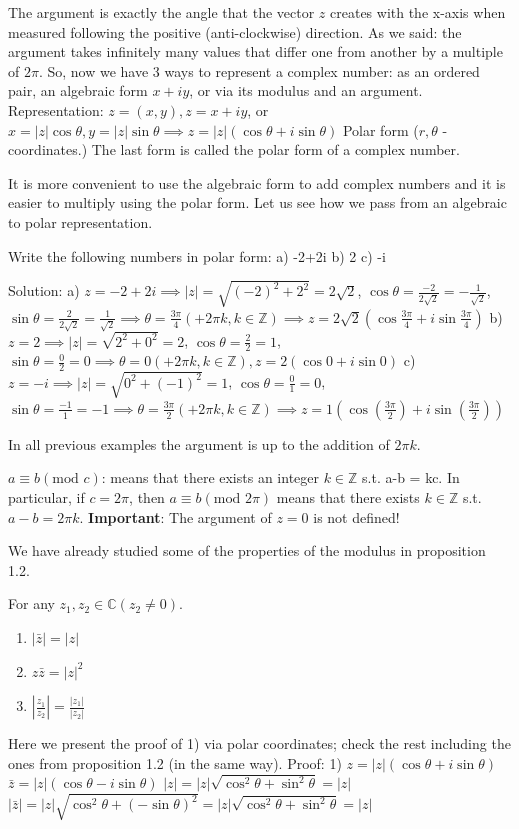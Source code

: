 \documentclass[12pt]{article}
\begin{document}
 The argument is exactly the angle that the vector $z$ creates with the x-axis when measured following the positive (anti-clockwise) direction.
 As we said: the argument takes infinitely many values that differ one from another by a multiple of $2\pi$.
 So, now we have 3 ways to represent a complex number: as an ordered pair, an algebraic form $x+iy$, or via its modulus and an argument.
 Representation: $z=(x,y), z=x+iy$, or $x=|z|\cos\theta, y=|z|\sin\theta \implies z=|z|(\cos\theta + i\sin\theta)$ Polar form ($r,\theta$ - coordinates.)
 The last form is called the polar form of a complex number.

It is more convenient to use the algebraic form to add complex numbers and it is easier to multiply using the polar form. Let us see how we pass from an algebraic to polar representation.

\begin{example}
 Write the following numbers in polar form:
 a) -2+2i b) 2 c) -i

Solution:
a) $z=-2+2i \implies |z| = \sqrt{(-2)^2+2^2} = 2\sqrt{2}$, $\cos\theta = \frac{-2}{2\sqrt{2}} = -\frac{1}{\sqrt{2}}$, $\sin\theta = \frac{2}{2\sqrt{2}} = \frac{1}{\sqrt{2}} \implies \theta = \frac{3\pi}{4}(+2\pi k, k\in \mathbb{Z}) \implies z = 2\sqrt{2}(\cos\frac{3\pi}{4}+i\sin\frac{3\pi}{4})$
b) $z=2 \implies |z| = \sqrt{2^2+0^2} = 2$, $\cos \theta = \frac{2}{2} = 1$, $\sin\theta = \frac{0}{2} = 0 \implies \theta = 0(+2\pi k, k\in \mathbb{Z}), z=2(\cos 0 + i\sin 0)$
c) $z=-i \implies |z| = \sqrt{0^2+(-1)^2} = 1$, $\cos\theta = \frac{0}{1} = 0$, $\sin\theta = \frac{-1}{1}=-1 \implies \theta = \frac{3\pi}{2}(+2\pi k, k\in \mathbb{Z}) \implies z = 1(\cos(\frac{3\pi}{2})+i\sin(\frac{3\pi}{2}))$
\end{example}
 In all previous examples the argument is up to the addition of $2\pi k$.
 \begin{remark}
$a \equiv b(\text{mod } c)$: means that there exists an integer $k\in\mathbb{Z}$ s.t. a-b = kc.
In particular, if $c=2\pi$, then $a\equiv b(\text{mod } 2\pi)$ means that there exists $k \in \mathbb{Z}$ s.t. $a-b = 2\pi k$.
\textbf{Important}: The argument of $z=0$ is not defined!
 \end{remark}
We have already studied some of the properties of the modulus in proposition 1.2.

\begin{proposition}
For any $z_1, z_2 \in \mathbb{C} (z_2\neq 0)$.
\begin{enumerate}
    \item $|\bar{z}|=|z|$
    \item $z\bar{z}=|z|^2$
    \item $\left|\frac{z_1}{z_2}\right| = \frac{|z_1|}{|z_2|}$
\end{enumerate}
\end{proposition}
Here we present the proof of 1) via polar coordinates; check the rest including the ones from proposition 1.2 (in the same way).
Proof:
1) $z = |z|(\cos\theta + i\sin\theta)$
$\bar{z} = |z|(\cos\theta - i\sin\theta)$
$|z| = |z|\sqrt{\cos^2\theta + \sin^2\theta} = |z|$
$|\bar{z}| = |z|\sqrt{\cos^2\theta + (-\sin\theta)^2} = |z|\sqrt{\cos^2\theta+\sin^2\theta} = |z|$
\end{document}
